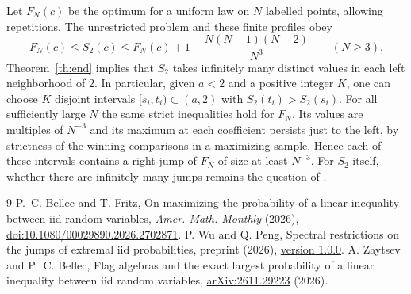 \documentclass[11pt]{article}
\begin{document}
Let $F_N(c)$ be the optimum for a uniform law on $N$ labelled points,
allowing repetitions. The unrestricted problem and these finite
profiles obey
\[
  F_N(c)\le S_2(c)\le F_N(c)+1-\frac{N(N-1)(N-2)}{N^3}
  \qquad(N\ge3).
\]
Theorem~\ref{th:end} implies that $S_2$ takes infinitely many distinct
values in each left neighborhood of $2$. In particular, given $a<2$ and
a positive integer $K$, one can choose $K$ disjoint intervals
$[s_i,t_i)\subset(a,2)$ with $S_2(t_i)>S_2(s_i)$. For all sufficiently
large $N$ the same strict inequalities hold for $F_N$. Its values are
multiples of $N^{-3}$ and its maximum at each coefficient persists just
to the left, by strictness of the winning comparisons in a maximizing
sample. Hence each of these intervals contains a right jump of $F_N$
of size at least $N^{-3}$. For $S_2$ itself, whether there are
infinitely many jumps remains the question of \cite[\S7.1.3]{zb}.

\begin{thebibliography}{9}
 P.~C. Bellec and T. Fritz,
On maximizing the probability of a linear inequality between iid random variables,
\emph{Amer. Math. Monthly} (2026),
\href{https://doi.org/10.1080/00029890.2026.2702871}{doi:10.1080/00029890.2026.2702871}.
 P. Wu and Q. Peng, Spectral restrictions on the jumps of extremal iid probabilities,
preprint (2026), \href{https://github.com/PEIWEIWU-AYS/iid-extremal-probability-jumps-spectral-radii/releases/tag/v1.0.0}{version 1.0.0}.
 A. Zaytsev and P.~C. Bellec,
Flag algebras and the exact largest probability of a linear inequality between iid random variables,
\href{https://arxiv.org/abs/2611.29223}{arXiv:2611.29223} (2026).
\end{thebibliography}
\end{document}
